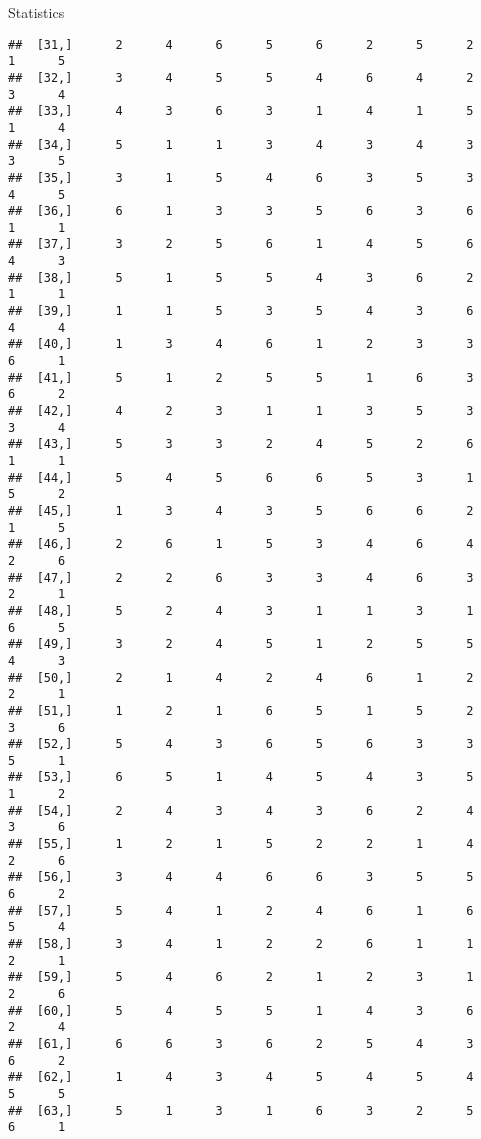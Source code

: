 \documentclass[
  ignorenonframetext,
]{beamer}
\begin{document}
\begin{frame}[fragile]{Statistics}
\begin{verbatim}
##  [31,]      2      4      6      5      6      2      5      2      1      5
##  [32,]      3      4      5      5      4      6      4      2      3      4
##  [33,]      4      3      6      3      1      4      1      5      1      4
##  [34,]      5      1      1      3      4      3      4      3      3      5
##  [35,]      3      1      5      4      6      3      5      3      4      5
##  [36,]      6      1      3      3      5      6      3      6      1      1
##  [37,]      3      2      5      6      1      4      5      6      4      3
##  [38,]      5      1      5      5      4      3      6      2      1      1
##  [39,]      1      1      5      3      5      4      3      6      4      4
##  [40,]      1      3      4      6      1      2      3      3      6      1
##  [41,]      5      1      2      5      5      1      6      3      6      2
##  [42,]      4      2      3      1      1      3      5      3      3      4
##  [43,]      5      3      3      2      4      5      2      6      1      1
##  [44,]      5      4      5      6      6      5      3      1      5      2
##  [45,]      1      3      4      3      5      6      6      2      1      5
##  [46,]      2      6      1      5      3      4      6      4      2      6
##  [47,]      2      2      6      3      3      4      6      3      2      1
##  [48,]      5      2      4      3      1      1      3      1      6      5
##  [49,]      3      2      4      5      1      2      5      5      4      3
##  [50,]      2      1      4      2      4      6      1      2      2      1
##  [51,]      1      2      1      6      5      1      5      2      3      6
##  [52,]      5      4      3      6      5      6      3      3      5      1
##  [53,]      6      5      1      4      5      4      3      5      1      2
##  [54,]      2      4      3      4      3      6      2      4      3      6
##  [55,]      1      2      1      5      2      2      1      4      2      6
##  [56,]      3      4      4      6      6      3      5      5      6      2
##  [57,]      5      4      1      2      4      6      1      6      5      4
##  [58,]      3      4      1      2      2      6      1      1      2      1
##  [59,]      5      4      6      2      1      2      3      1      2      6
##  [60,]      5      4      5      5      1      4      3      6      2      4
##  [61,]      6      6      3      6      2      5      4      3      6      2
##  [62,]      1      4      3      4      5      4      5      4      5      5
##  [63,]      5      1      3      1      6      3      2      5      6      1

\end{verbatim}
\end{frame}
\end{document}
